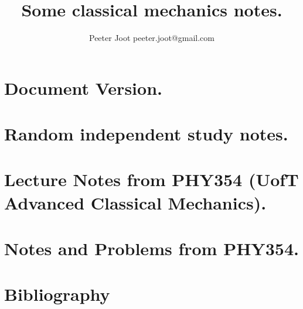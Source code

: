 \documentclass[12pt,leqno]{book}
\begin{document}

\title{Some classical mechanics notes.}
\author{Peeter Joot \quad peeter.joot@gmail.com}

\maketitle

\clearpage{}
\tableofcontents

\clearpage{}

\pagestyle{plain}




\part{Document Version.}


\part{Random independent study notes.}












\part{Lecture Notes from PHY354 (UofT Advanced Classical Mechanics).}



\part{Notes and Problems from PHY354.}





%
\part{Bibliography}




\end{document}
